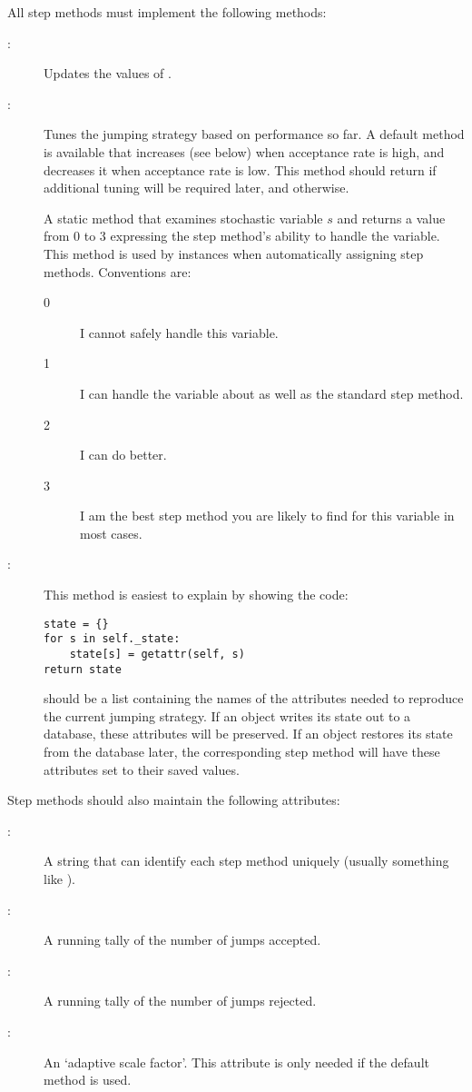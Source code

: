 All step methods must implement the following methods:
\begin{description}
   \item[:] Updates the values of .
   \item[:] Tunes the jumping strategy based on performance so far. A default method is available that increases  (see below) when acceptance rate is high, and decreases it when acceptance rate is low. This method should return  if additional tuning will be required later, and  otherwise.
   \item[] A static method that examines stochastic variable $s$ and returns a value from 0 to 3 expressing the step method's ability to handle the variable. This method is used by  instances when automatically assigning step methods. Conventions are:
   \begin{description}
      \item[0] I cannot safely handle this variable. 
      \item[1] I can handle the variable about as well as the standard  step method.
      \item[2] I can do better.
      \item[3] I am the best step method you are likely to find for this variable in most cases.
   \end{description}
   \item[:] This method is easiest to explain by showing the code:
   \begin{verbatim}
state = {}
for s in self._state:
    state[s] = getattr(self, s)
return state      
   \end{verbatim}
    should be a list containing the names of the attributes needed to reproduce the current jumping strategy. If an  object writes its state out to a database, these attributes will be preserved. If an  object restores its state from the database later, the corresponding step method will have these attributes set to their saved values.
\end{description}

Step methods should also maintain the following attributes:
\begin{description}
   \item[:] A string that can identify each step method uniquely (usually something like ).
   \item[:] A running tally of the number of jumps accepted.
   \item[:] A running tally of the number of jumps rejected.   
   \item[:] An `adaptive scale factor'. This attribute is only needed if the default  method is used.
\end{description}

